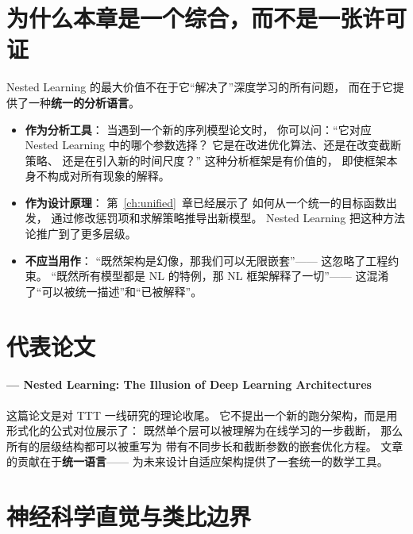 \section{为什么本章是一个综合，而不是一张许可证}
\label{sec:nested_synthesis}

Nested Learning 的最大价值不在于它``解决了''深度学习的所有问题，
而在于它提供了一种\textbf{统一的分析语言}。

\begin{itemize}
  \item \textbf{作为分析工具}：
    当遇到一个新的序列模型论文时，
    你可以问：``它对应 Nested Learning 中的哪个参数选择？
    它是在改进优化算法、还是在改变截断策略、
    还是在引入新的时间尺度？''
    这种分析框架是有价值的，
    即使框架本身不构成对所有现象的解释。

  \item \textbf{作为设计原理}：
    第~\ref{ch:unified}~章已经展示了
    如何从一个统一的目标函数出发，
    通过修改惩罚项和求解策略推导出新模型。
    Nested Learning 把这种方法论推广到了更多层级。

  \item \textbf{不应当用作}：
    ``既然架构是幻像，那我们可以无限嵌套''——
    这忽略了工程约束。
    ``既然所有模型都是 NL 的特例，那 NL 框架解释了一切''——
    这混淆了``可以被统一描述''和``已被解释''。
\end{itemize}

\section{代表论文}
\label{sec:nested_papers}

\paragraph{\citet{anonymous2025nested} --- Nested Learning: The Illusion of Deep Learning Architectures}
这篇论文是对 TTT 一线研究的理论收尾。
它不提出一个新的跑分架构，而是用形式化的公式对位展示了：
既然单个层可以被理解为在线学习的一步截断，
那么所有的层级结构都可以被重写为
带有不同步长和截断参数的嵌套优化方程。
文章的贡献在于\textbf{统一语言}——
为未来设计自适应架构提供了一套统一的数学工具。

\section{神经科学直觉与类比边界}
\label{sec:nested_neuro}

